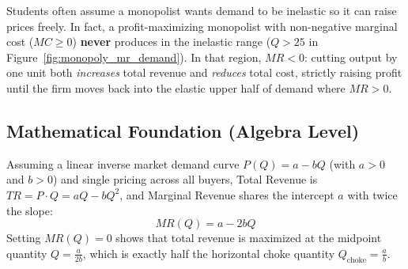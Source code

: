 \documentclass[11pt,letterpaper]{article}
\begin{document}
\begin{tcolorbox}[colback=CourseAmber!10!white,colframe=CourseOrange,title=\textbf{Clear It Up: Why a Monopolist Never Operates on the Inelastic Portion of Demand}]
Students often assume a monopolist wants demand to be inelastic so it can raise prices freely. In fact, a profit-maximizing monopolist with non-negative marginal cost ($MC \ge 0$) \textbf{never} produces in the inelastic range ($Q > 25$ in Figure~\ref{fig:monopoly_mr_demand}). In that region, $MR < 0$: cutting output by one unit both \emph{increases} total revenue and \emph{reduces} total cost, strictly raising profit until the firm moves back into the elastic upper half of demand where $MR > 0$.
\end{tcolorbox}

\subsection*{Mathematical Foundation (Algebra Level)}
Assuming a linear inverse market demand curve $P(Q) = a - bQ$ (with $a > 0$ and $b > 0$) and single pricing across all buyers, Total Revenue is $TR = P \cdot Q = aQ - bQ^2$, and Marginal Revenue shares the intercept $a$ with twice the slope:
\begin{equation}
MR(Q) = a - 2bQ
\end{equation}
Setting $MR(Q) = 0$ shows that total revenue is maximized at the midpoint quantity $Q = \frac{a}{2b}$, which is exactly half the horizontal choke quantity $Q_{\text{choke}} = \frac{a}{b}$.
\end{document}
